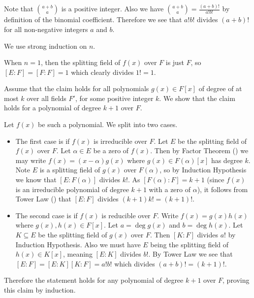 \begin{questions}
    \item \begin{partquestions}{\roman*}
        \item Note that ${a+b\choose a}$ is a positive integer. Also we have ${a+b\choose a} = \frac{(a+b)!}{a!b!}$ by definition of the binomial coefficient. Therefore we see that $a!b!$ divides $(a+b)!$ for all non-negative integers $a$ and $b$.

        \item We use strong induction on $n$.

        When $n = 1$, then the splitting field of $f(x)$ over $F$ is just $F$, so $[E:F] = [F:F] = 1$ which clearly divides $1! = 1$.

        Assume that the claim holds for all polynomials $g(x) \in F[x]$ of degree of at most $k$ over all fields $F'$, for some positive integer $k$. We show that the claim holds for a polynomial of degree $k+1$ over $F$.

        Let $f(x)$ be such a polynomial. We split into two cases.
        \begin{itemize}
            \item The first case is if $f(x)$ is irreducible over $F$. Let $E$ be the splitting field of $f(x)$ over $F$. Let $\alpha \in E$ be a zero of $f(x)$. Then by Factor Theorem () we may write $f(x) = (x-\alpha)g(x)$ where $g(x) \in F(\alpha)[x]$ has degree $k$. Note $E$ is a splitting field of $g(x)$ over $F(\alpha)$, so by Induction Hypothesis we know that $[E:F(\alpha)]$ divides $k!$. As $[F(\alpha):F] = k+1$ (since $f(x)$ is an irreducible polynomial of degree $k+1$ with a zero of $\alpha$), it follows from Tower Law () that $[E:F]$ divides $(k+1)k! = (k+1)!$.

            \item The second case is if $f(x)$ is reducible over $F$. Write $f(x) = g(x)h(x)$ where $g(x), h(x) \in F[x]$. Let $a = \deg g(x)$ and $b = \deg h(x)$. Let $K \subseteq E$ be the splitting field of $g(x)$ over $F$. Then $[K:F]$ divides $a!$ by Induction Hypothesis. Also we must have $E$ being the splitting field of $h(x) \in K[x]$, meaning $[E:K]$ divides $b!$. By Tower Law we see that $[E:F] = [E:K][K:F] = a!b!$ which divides $(a+b)! = (k+1)!$.
        \end{itemize}
        Therefore the statement holds for any polynomial of degree $k+1$ over $F$, proving this claim by induction.
    \end{partquestions}
\end{questions}
